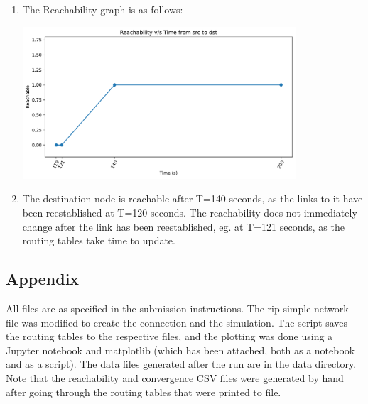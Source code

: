 \documentclass[12pt]{article}
\begin{document}
\begin{enumerate}[label=(\alph*)]
    \item The Reachability graph is as follows:
    \begin{center}
        \includegraphics[width=0.8\textwidth]{../Q2/q2b_reachable_3.pdf}
    \end{center}

    \item The destination node is reachable after T=140 seconds, as the 
        links to it have been reestablished at T=120 seconds. The reachability 
        does not immediately change after the link has been reestablished, eg. at 
        T=121 seconds, as the routing tables take time to update. 
\end{enumerate}

\subsection*{Appendix}

All files are as specified in the submission instructions. The rip-simple-network file was 
modified to create the connection and the simulation. The script saves the routing 
tables to the respective files, and the plotting was done using a Jupyter notebook 
and matplotlib (which has been attached, both as a notebook and as a script). 
The data files generated after the run are in the data directory. Note that the 
reachability and convergence CSV files were generated by hand after going 
through the routing tables that were printed to file.
\end{document}
